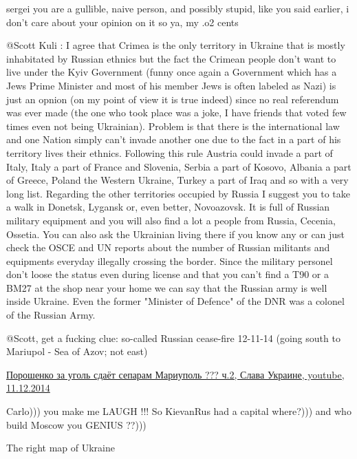 \begin{itemize}
\begin{itemize}

sergei you are a gullible, naive person, and possibly stupid, like you said
earlier, i don't care about your opinion on it so ya, my .o2 cents


@Scott Kuli : I agree that Crimea is the only territory in Ukraine that is
mostly inhabitated by Russian ethnics but the fact the Crimean people don't
want to live under the Kyiv Government (funny once again a Government which has
a Jews Prime Minister and most of his member Jews is often labeled as Nazi) is
just an opnion (on my point of view it is true indeed) since no real referendum
was ever made (the one who took place was a joke, I have friends that voted few
times even not being Ukrainian). Problem is that there is the international law
and one Nation simply can't invade another one due to the fact in a part of his
territory lives their ethnics. Following this rule Austria could invade a part
of Italy, Italy a part of France and Slovenia, Serbia a part of Kosovo, Albania
a part of Greece, Poland the Western Ukraine, Turkey a part of Iraq and so with
a very long list. Regarding the other territories occupied by Russia I suggest
you to take a walk in Donetsk, Lygansk or, even better, Novoazovsk. It is full
of Russian military equipment and you will also find a lot a people from
Russia, Cecenia, Ossetia. You can also ask the Ukrainian living there if you
know any or can just check the OSCE and UN reports about the number of Russian
militants and equipments everyday illegally crossing the border. Since the
military personel don't loose the status even during license and that you can't
find a T90 or a BM27 at the shop near your home we can say that the Russian
army is well inside Ukraine. Even the former "Minister of Defence" of the DNR
was a colonel of the Russian Army.


@Scott, get a fucking clue: so-called Russian cease-fire 12-11-14 (going south
to Mariupol - Sea of Azov; not east)

\href{https://www.youtube.com/watch?v=0PAbaLyNlKk}{%
Порошенко за уголь сдаёт сепарам Мариуполь ??? ч.2, Слава Украине, youtube, 11.12.2014%
}


Carlo))) you make me LAUGH !!! So KievanRus had a capital where?))) and who build Moscow you GENIUS ??)))

The right map of Ukraine


\end{itemize}
\end{itemize}
